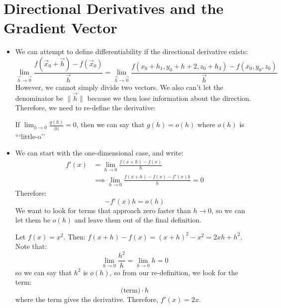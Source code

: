 \section{Directional Derivatives and the Gradient Vector}
\begin{itemize}
    \item We can attempt to define differentiability if the directional derivative exists:
    \begin{equation}
        \lim_{\vec{h}\to\vec{0}}  \frac{f(\vec{x}_0+\vec{h})-f(\vec{x}_0)}{\vec{h}} = \lim_{\vec{h}\to\vec{0}} \frac{f(x_0+h_1, y_0+h+2, z_0+h_3) - f(x_0, y_0, z_0)}{\vec{h}}
    \end{equation}
    However, we cannot simply divide two vectors. We also can't let the denominator be $\lVert \vec{h} \rVert$ because we then lose information about the direction. Therefore, we need to re-define the derivative:
    \begin{definition}
        If $\lim_{h\to 0} \frac{g(h)}{|h|} = 0$, then we can say that $g(h) = o(h)$ where $o(h)$ is ```little-o''
    \end{definition}
    \item We can start with the one-dimensional case, and write:
    \begin{align}
        f'(x) &= \lim_{h\to 0} \frac{f(x+h)-f(x)}{h} \\
        &\implies \lim_{h\to 0}\frac{f(x+h)-f(x)-f'(x)h}{h} = 0 
    \end{align}
    Therefore:
    \begin{equation}
        [f(x+h)-f(x)]-f'(x)h = o(h)
    \end{equation}
    We want to look for terms that approach zero faster than $h\to 0$, so we can let them be $o(h)$ and leave them out of the final definition.
    \begin{example}
        Let $f(x)=x^2$. Then: $f(x+h)-f(x)=(x+h)^2-x^2=2xh+h^2$. Note that:
        \begin{equation}
            \lim_{h\to 0} \frac{h^2}{h} = \lim_{h\to 0}h = 0
        \end{equation}
        so we can say that $h^2$ is $o(h)$, so from our re-definition, we look for the term:
        \begin{equation}
            \text{(term)} \cdot h
        \end{equation}
        where the term gives the derivative. Therefore, $f'(x)=2x$.
    \end{example}
    \begin{idea}

\end{idea}
\end{itemize}

